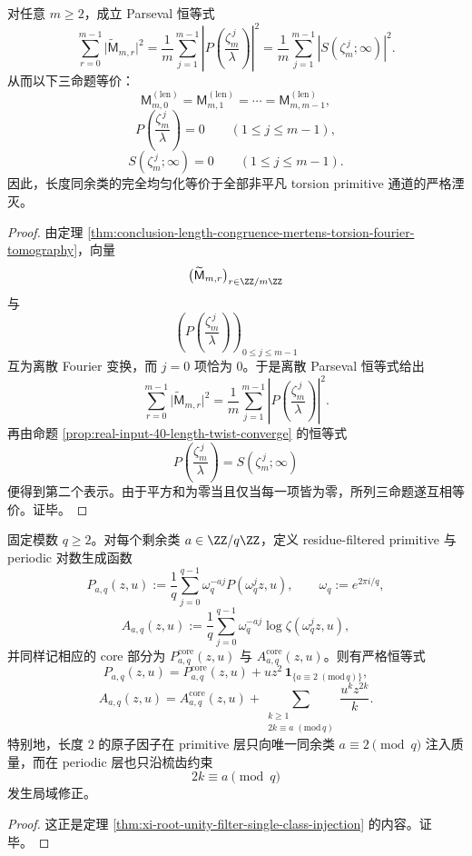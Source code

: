 \begin{corollary}\label{cor:conclusion-length-congruence-mertens-parseval-uniformization}
对任意 \(m\ge 2\)，成立 Parseval 恒等式
\[
\sum_{r=0}^{m-1}\bigl|\widetilde{\mathsf M}_{m,r}\bigr|^2
=
\frac1m\sum_{j=1}^{m-1}\left|P\!\left(\frac{\zeta_m^{\,j}}{\lambda}\right)\right|^2
=
\frac1m\sum_{j=1}^{m-1}\left|S(\zeta_m^{\,j};\infty)\right|^2.
\]
从而以下三命题等价：
\[
\mathsf M_{m,0}^{(\mathrm{len})}
=
\mathsf M_{m,1}^{(\mathrm{len})}
=\cdots=
\mathsf M_{m,m-1}^{(\mathrm{len})},
\]
\[
P\!\left(\frac{\zeta_m^{\,j}}{\lambda}\right)=0
\qquad (1\le j\le m-1),
\]
\[
S(\zeta_m^{\,j};\infty)=0
\qquad (1\le j\le m-1).
\]
因此，长度同余类的完全均匀化等价于全部非平凡 torsion primitive 通道的严格湮灭。
\end{corollary}
\begin{proof}
由定理 \ref{thm:conclusion-length-congruence-mertens-torsion-fourier-tomography}，向量
\[
\bigl(\widetilde{\mathsf M}_{m,r}\bigr)_{r\in\ZZ/m\ZZ}
\]
与
\[
\left(P\!\left(\frac{\zeta_m^{\,j}}{\lambda}\right)\right)_{0\le j\le m-1}
\]
互为离散 Fourier 变换，而 \(j=0\) 项恰为 \(0\)。于是离散 Parseval 恒等式给出
\[
\sum_{r=0}^{m-1}\bigl|\widetilde{\mathsf M}_{m,r}\bigr|^2
=
\frac1m\sum_{j=1}^{m-1}\left|P\!\left(\frac{\zeta_m^{\,j}}{\lambda}\right)\right|^2.
\]
再由命题 \ref{prop:real-input-40-length-twist-converge} 的恒等式
\[
P\!\left(\frac{\zeta_m^{\,j}}{\lambda}\right)=S(\zeta_m^{\,j};\infty)
\]
便得到第二个表示。由于平方和为零当且仅当每一项皆为零，所列三命题遂互相等价。证毕。
\end{proof}

\begin{theorem}\label{thm:conclusion-length2-atomic-root-unity-singleclass-injection}
固定模数 \(q\ge 2\)。对每个剩余类 \(a\in \ZZ/q\ZZ\)，定义 residue-filtered primitive 与 periodic 对数生成函数
\[
P_{a,q}(z,u):=\frac1q\sum_{j=0}^{q-1}\omega_q^{-aj}P(\omega_q^j z,u),
\qquad
\omega_q:=e^{2\pi i/q},
\]
\[
A_{a,q}(z,u):=\frac1q\sum_{j=0}^{q-1}\omega_q^{-aj}\log\zeta(\omega_q^j z,u),
\]
并同样记相应的 core 部分为 \(P_{a,q}^{\mathrm{core}}(z,u)\) 与 \(A_{a,q}^{\mathrm{core}}(z,u)\)。则有严格恒等式
\[
P_{a,q}(z,u)
=
P_{a,q}^{\mathrm{core}}(z,u)
+
u z^2\,\mathbf 1_{\{a\equiv 2\;(\mathrm{mod}\,q)\}},
\]
\[
A_{a,q}(z,u)
=
A_{a,q}^{\mathrm{core}}(z,u)
+
\sum_{\substack{k\ge 1\\ 2k\equiv a\;(\mathrm{mod}\,q)}}\frac{u^k z^{2k}}{k}.
\]
特别地，长度 \(2\) 的原子因子在 primitive 层只向唯一同余类 \(a\equiv 2\pmod q\) 注入质量，而在 periodic 层也只沿梳齿约束
\[
2k\equiv a\pmod q
\]
发生局域修正。
\end{theorem}
\begin{proof}
这正是定理 \ref{thm:xi-root-unity-filter-single-class-injection} 的内容。证毕。
\end{proof}

